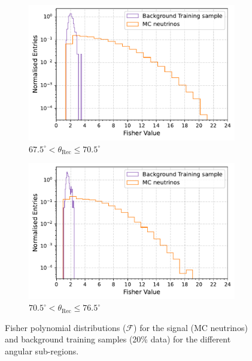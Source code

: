 \begin{figure}[h!]
    \begin{subfigure}[r]{.48\textwidth}
      \centering
      \includegraphics[width=\linewidth]{thesis_figures/Nu_analysis/Fisher_plots/Fisher_nu_bkg_region_67.5_70.5.pdf}
      \caption{$ 67.5^{\circ} <\theta_{\text{Rec}} \leq 70.5^{\circ}$}
    \end{subfigure}
    \hfill    
    \begin{subfigure}[r]{.48\textwidth}
      \centering
      \includegraphics[width=\linewidth]{thesis_figures/Nu_analysis/Fisher_plots/Fisher_nu_bkg_region_70.5_73.5.pdf}
      \caption{$ 70.5^{\circ} <\theta_{\text{Rec}} \leq 76.5^{\circ}$}
   \end{subfigure}
   \caption{Fisher polynomial distributions ($\mathcal{F}$) for the signal (MC neutrinos) and background training samples (20\% data) for the different angular sub-regions.}
    \label{fig:Fisher_dists}

\end{figure}


